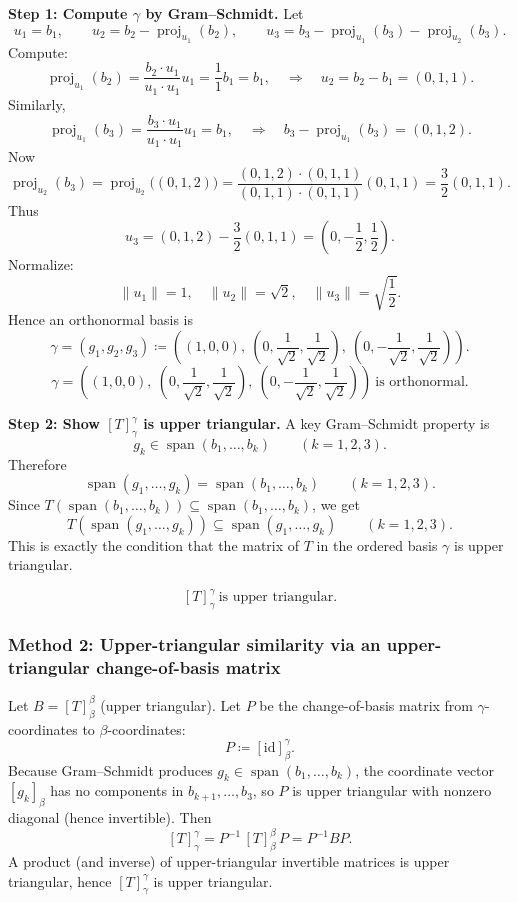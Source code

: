 \documentclass[12pt]{article}
\newcommand{\df}{\coloneqq}
\DeclareMathOperator{\Span}{span}
\DeclareMathOperator{\proj}{proj}
\newcommand{\Id}{\mathrm{id}}
\begin{document}
\medskip
\noindent\textbf{Step 1: Compute $\gamma$ by Gram--Schmidt.}
Let
\[
u_1=b_1,\qquad
u_2=b_2-\proj_{u_1}(b_2),\qquad
u_3=b_3-\proj_{u_1}(b_3)-\proj_{u_2}(b_3).
\]
Compute:
\[
\proj_{u_1}(b_2)=\frac{b_2\cdot u_1}{u_1\cdot u_1}u_1=\frac{1}{1}b_1=b_1,
\quad\Rightarrow\quad u_2=b_2-b_1=(0,1,1).
\]
Similarly,
\[
\proj_{u_1}(b_3)=\frac{b_3\cdot u_1}{u_1\cdot u_1}u_1=b_1,
\quad\Rightarrow\quad b_3-\proj_{u_1}(b_3)=(0,1,2).
\]
Now
\[
\proj_{u_2}(b_3)=\proj_{u_2}\bigl((0,1,2)\bigr)
=\frac{(0,1,2)\cdot (0,1,1)}{(0,1,1)\cdot(0,1,1)}(0,1,1)
=\frac{3}{2}(0,1,1).
\]
Thus
\[
u_3=(0,1,2)-\frac{3}{2}(0,1,1)=\left(0,-\frac12,\frac12\right).
\]
Normalize:
\[
\|u_1\|=1,\quad \|u_2\|=\sqrt2,\quad \|u_3\|=\sqrt{\frac12}.
\]
Hence an orthonormal basis is
\[
\gamma=(g_1,g_2,g_3)\df
\left(
(1,0,0),\ \left(0,\frac{1}{\sqrt2},\frac{1}{\sqrt2}\right),\ \left(0,-\frac{1}{\sqrt2},\frac{1}{\sqrt2}\right)
\right).
\]
\[
\boxed{\,
\gamma=\left(
(1,0,0),\ \left(0,\frac{1}{\sqrt2},\frac{1}{\sqrt2}\right),\ \left(0,-\frac{1}{\sqrt2},\frac{1}{\sqrt2}\right)
\right)\ \text{is orthonormal.}
\,}
\]

\medskip
\noindent\textbf{Step 2: Show $[T]_\gamma^\gamma$ is upper triangular.}
A key Gram--Schmidt property is
\[
g_k\in \Span(b_1,\dots,b_k)\qquad (k=1,2,3).
\]
Therefore
\[
\Span(g_1,\dots,g_k)=\Span(b_1,\dots,b_k)\qquad (k=1,2,3).
\]
Since $T(\Span(b_1,\dots,b_k))\subseteq \Span(b_1,\dots,b_k)$, we get
\[
T(\Span(g_1,\dots,g_k))\subseteq \Span(g_1,\dots,g_k)\qquad (k=1,2,3).
\]
This is exactly the condition that the matrix of $T$ in the ordered basis $\gamma$ is upper triangular.

\[
\boxed{\, [T]_{\gamma}^{\gamma}\ \text{is upper triangular.}\,}
\]

\subsubsection{Method 2: Upper-triangular similarity via an upper-triangular change-of-basis matrix}
Let $B=[T]_{\beta}^{\beta}$ (upper triangular). Let $P$ be the change-of-basis matrix from $\gamma$-coordinates to $\beta$-coordinates:
\[
P \df [\Id]_{\beta}^{\gamma}.
\]
Because Gram--Schmidt produces $g_k\in\Span(b_1,\dots,b_k)$, the coordinate vector $[g_k]_\beta$ has no components in $b_{k+1},\dots,b_3$,
so $P$ is upper triangular with nonzero diagonal (hence invertible).
Then
\[
[T]_{\gamma}^{\gamma}=P^{-1}\,[T]_{\beta}^{\beta}\,P=P^{-1}BP.
\]
A product (and inverse) of upper-triangular invertible matrices is upper triangular, hence $[T]_{\gamma}^{\gamma}$ is upper triangular.
\end{document}
